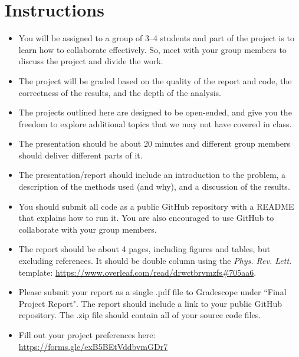 \newif\ifshowsolutions
\showsolutionsfalse

\usepackage[style=phys,
biblabel=brackets,
]{biblatex}
\DeclareSourcemap{
 \maps[datatype=bibtex,overwrite=true]{
  \map{
    \step[fieldsource=Collaboration, final=true]
    \step[fieldset=usera, origfieldval, final=true]
  }
 }
}





\pagestyle{fancy}

\section*{Instructions}
\begin{itemize}
  \item You will be assigned to a group of 3--4 students and part of the project is to learn how to collaborate effectively.
        So, meet with your group members to discuss the project and divide the work.
  \item The project will be graded based on the quality of the report and code, the correctness of the results, and the depth of the analysis.
  \item The projects outlined here are designed to be open-ended, and give you the freedom to explore additional topics that we may not have covered in class.
  \item The presentation should be about 20 minutes and different group members should deliver different parts of it.
  \item The presentation/report should include an introduction to the problem, a description of the methods used (and why), and a discussion of the results.
  \item You should submit all code as a public GitHub repository with a README that explains how to run it.
        You are also encouraged to use GitHub to collaborate with your group members.
  \item The report should be about 4 pages, including figures and tables, but excluding references.
        It should be double column using the \emph{Phys. Rev. Lett.} template: \url{https://www.overleaf.com/read/drwctbrvmzfs#705aa6}.
  \item Please submit your report as a single .pdf file to Gradescope under ``Final Project Report".
        The report should include a link to your public GitHub repository.
        The .zip file should contain all of your source code files.
  \item Fill out your project preferences here: \url{https://forms.gle/exB5BEtVddbvmGDr7}
\end{itemize}

